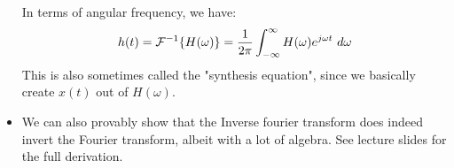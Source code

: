 \begin{itemize}
		In terms of angular frequency, we have:
		\[
		h(t) = \mathcal F^{-1} \{H(\omega)\} = \frac{1}{2\pi}\int_{-\infty}^{\infty} H(\omega) 
		e^{j \omega t}\ d \omega 
		\] 
		This is also sometimes called the "synthesis equation", since we basically create \(  x(t) \) out of 
		\( H(\omega) \). 
	\item We can also provably show that the Inverse fourier transform does indeed invert the Fourier transform, 
		albeit with a lot of algebra. See lecture slides for the full derivation.  
	\end{itemize}
